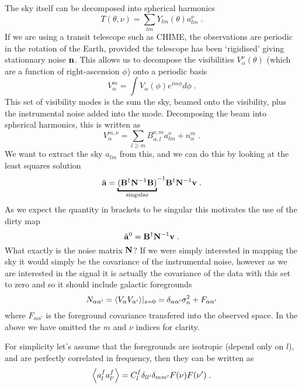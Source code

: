 \documentclass{revtex4}
\newcommand{\la}{\ensuremath{\left\langle}}
\newcommand{\ra}{\ensuremath{\right\rangle}}
\begin{document}
The sky itself can be decomposed into spherical harmonics
\begin{equation}
T(\theta, \nu) = \sum_{lm} Y_{lm}(\theta) a_{lm}^\nu \; .
\end{equation}
If we are using a transit telescope such as CHIME, the observations
are periodic in the rotation of the Earth, provided the telescope has
been `rigidised' giving stationnary noise $\mathbf{n}$. This allows us to
decompose the visibilities $V_\alpha^{\nu}(\theta)$ (which are a
function of right-ascension $\phi$) onto a periodic basis
\begin{equation}
V_\alpha^m = \int V_\alpha(\phi) e^{i m \phi} d\phi \; .
\end{equation}
This set of visibility modes is the sum the sky, beamed onto the
visibility, plus the instrumental noise added into the
mode. Decomposing the beam into spherical harmonics, this is written as
\begin{equation}
V_\alpha^{m,\nu} = \sum_{l \geq m} B_{\alpha,l}^{\nu,m} a_{lm}^\nu + n_\alpha^m \; .
\end{equation}
We want to extract the sky $a_{lm}$ from this, and we can do this by
looking at the least squares solution
\begin{equation}
\tilde{\va} = {\underbracket{(\mB^\hconj \mN^{-1} \mB)}_{\text{singular}}}^{-1} \mB^\hconj \mN^{-1} \vv \; .
\end{equation}
As we expect the quantity in brackets to be singular this motivates
the use of the dirty map
\begin{equation}
\tilde{\mathbf{a}}^0 = \mathbf{B}^{\dagger} \mathbf{N}^{-1} \mathbf{v} \; .
\end{equation}
What exactly is the noise matrix $\mathbf{N}$? If we were simply interested
in mapping the sky it would simply be the covariance of the
instrumental noise, however as we are interested in the \tcm {} signal it
is actually the covariance of the data with this set to zero and so it
should include galactic foregrounds
\begin{equation}
N_{\alpha \alpha'} = \la V_\alpha V_{\alpha'} \ra \rvert_{s = 0}  = \delta_{\alpha \alpha'} \sigma_n^2 + F_{\alpha \alpha'}
\end{equation}
where $F_{\alpha\alpha'}$ is the foreground covariance transfered into
the observed space. In the above we have omitted the $m$ and $\nu$
indices for clarity.

For simplicity let's assume that the foregrounds are isotropic (depend
only on $l$), and are perfectly correlated in frequency, then they can
be written as
\begin{equation}
\la a^f_l a^f_{l'} \ra = C_l^f \delta_{l l'} \delta_{m m'} F(\nu) F(\nu') \; .
\end{equation}
\end{document}

